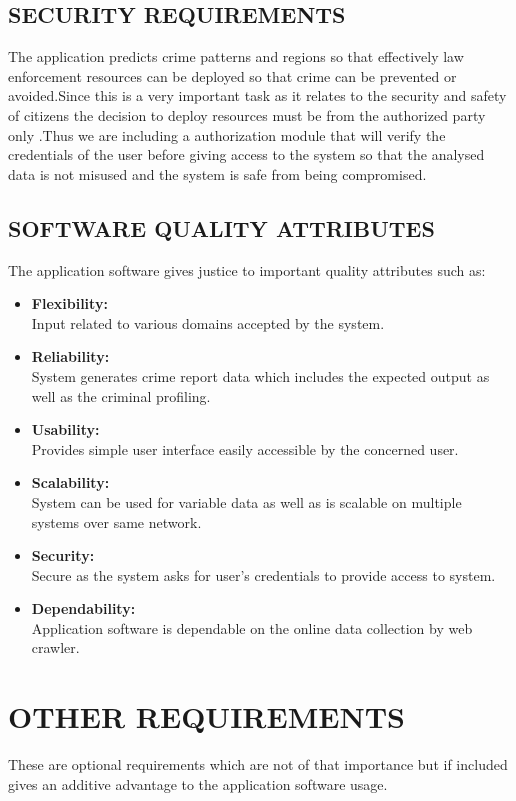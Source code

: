 \documentclass[12pt]{extreport}
\begin{document}
     \subsection{SECURITY REQUIREMENTS}
\hspace*{5em}The application predicts crime patterns and regions so that effectively law enforcement resources can be deployed so that crime can be prevented or avoided.Since this is a very important task as it relates to the security and safety of citizens the decision to deploy resources must be from the authorized party only .Thus we are including a authorization module that will verify the credentials of the user before giving access to the system so that the analysed data is not misused and the system is safe from being compromised.     
     \subsection{SOFTWARE QUALITY ATTRIBUTES}
The application software gives justice to important quality attributes such as:
\begin{itemize}
\item \textbf{Flexibility:}\\ Input related to various domains accepted by the system.
\item \textbf{Reliability:}\\ System generates crime report data which includes the expected output as well as the criminal profiling.
\item \textbf{Usability:}\\Provides simple user interface easily accessible by the concerned user.
\item \textbf{Scalability:}\\System can be used for variable data as well as is scalable on multiple systems over same network.
\item \textbf{Security:}\\Secure as the system asks for user's credentials to provide access to system.
\item \textbf{Dependability:}\\Application software is dependable on the online data collection by web crawler.
\end{itemize}     
     
\newpage
\noindent
\section{OTHER REQUIREMENTS}
\hspace*{5em}These are optional requirements which are not of that importance but if included gives an additive advantage to the application software usage.
\end{document}
